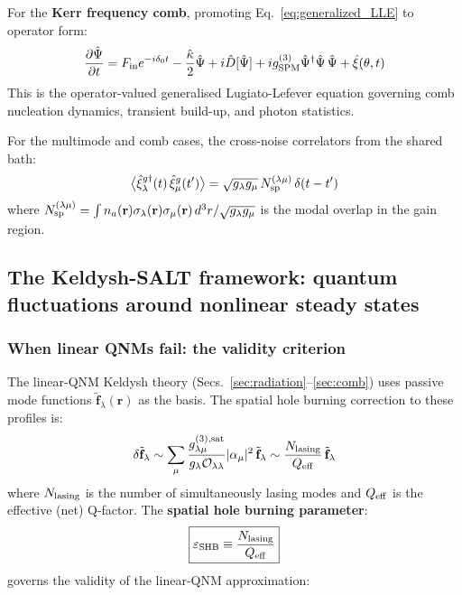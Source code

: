 \documentclass[12pt]{article}
\newcommand{\tf}{\tilde{\mathbf{f}}}
\begin{document}
For the \textbf{Kerr frequency comb}, promoting
Eq.~\eqref{eq:generalized_LLE} to operator form:
\begin{equation}
  \frac{\partial\hat\Psi}{\partial t} =
  F_{\rm in}e^{-i\delta_0 t}
  - \frac{\hat\kappa}{2}\hat\Psi
  + i\hat{D}[\hat\Psi]
  + ig^{(3)}_{\rm SPM}\hat\Psi^\dagger\hat\Psi\,\hat\Psi
  + \hat\xi(\theta,t)
  \label{eq:HL_LLE_operator}
\end{equation}
This is the operator-valued generalised Lugiato-Lefever equation governing
comb nucleation dynamics, transient build-up, and photon statistics.

For the multimode and comb cases, the cross-noise
correlators from the shared bath:
\begin{equation}
  \bigl\langle\hat{\xi}^{g\dagger}_\lambda(t)\,\hat{\xi}^g_\mu(t')\bigr\rangle
  = \sqrt{g_\lambda g_\mu}\,N_{\rm sp}^{(\lambda\mu)}\,\delta(t-t')
  \label{eq:cross_noise_HL}
\end{equation}
where $N_{\rm sp}^{(\lambda\mu)}
= \int n_a(\mathbf{r})\sigma_\lambda(\mathbf{r})\sigma_\mu(\mathbf{r})\,d^3r
/\sqrt{g_\lambda g_\mu}$ is the modal overlap in the gain region.

\subsection{The Keldysh-SALT framework: quantum fluctuations around
nonlinear steady states}
\label{sec:SALT_Keldysh}

\subsubsection*{When linear QNMs fail: the validity criterion}

The linear-QNM Keldysh theory (Secs.~\ref{sec:radiation}--\ref{sec:comb})
uses passive mode functions $\tf_\lambda(\mathbf{r})$ as the basis.
The spatial hole burning correction to these profiles is:
\begin{equation}
  \delta\tf_\lambda \sim
  \sum_\mu \frac{g^{(3),\rm sat}_{\lambda\mu}}{g_\lambda\mathcal{O}_{\lambda\lambda}}
  |\alpha_\mu|^2\,\tf_\lambda
  \sim \frac{N_{\rm lasing}}{Q_{\rm eff}}\,\tf_\lambda
  \label{eq:hole_burning_correction}
\end{equation}
where $N_{\rm lasing}$ is the number of simultaneously lasing modes and
$Q_{\rm eff}$ is the effective (net) Q-factor.  The \textbf{spatial hole
burning parameter}:
\begin{equation}
  \boxed{
  \varepsilon_{\rm SHB} \equiv \frac{N_{\rm lasing}}{Q_{\rm eff}}
  }
  \label{eq:SHB}
\end{equation}
governs the validity of the linear-QNM approximation:
\end{document}

